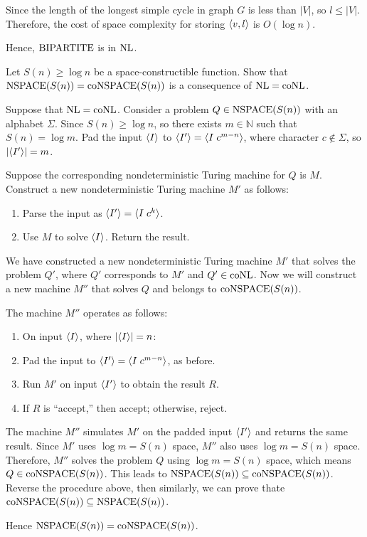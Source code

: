 \documentclass{homework}
\begin{document}
\begin{solution}
  Since the length of the longest simple cycle in graph $G$ is less than $|V|$,
  so $l \le |V|$.
  Therefore, the cost of space complexity for storing $\langle v, l\rangle$ is $O(\log n)$.

  Hence, $\mathrm{BIPARTITE}$ is in $\textup{NL}$.

\end{solution}

\begin{problem}
  Let $S(n) \ge \log n$ be a space-constructible function.
  Show that $\textup{NSPACE}(S(n)) = \textup{coNSPACE}(S(n))$ is a consequence of
  $\textup{NL} = \textup{coNL}$.
\end{problem}

\begin{solution}

  Suppose that $\textup{NL} = \textup{coNL}$. Consider a problem $Q \in \textup{NSPACE}(S(n))$
  with an alphabet $\Sigma$.
  Since $S(n) \ge \log n$, so there exists $m \in \mathbb{N}$
  such that $S(n) = \log m$.
  Pad the input $\langle I\rangle$ to $\langle I'\rangle = \langle I\;c^{m - n}\rangle$,
  where character $c \notin \Sigma$, so $|\langle I'\rangle| = m$.

  Suppose the corresponding nondeterministic Turing machine for $Q$ is $M$.
  Construct a new nondeterministic Turing machine $M'$ as follows:

  \begin{enumerate}
    \item Parse the input as $\langle I'\rangle = \langle I\;c^k\rangle$.
    \item Use $M$ to solve $\langle I\rangle$. Return the result.
  \end{enumerate}

  We have constructed a new nondeterministic Turing machine $M'$ that
  solves the problem $Q'$, where $Q'$ corresponds to $M'$ and $Q' \in \textup{coNL}$.
  Now we will construct a new machine $M''$ that
  solves $Q$ and belongs to $\textup{coNSPACE}(S(n))$.

  The machine $M''$ operates as follows:

  \begin{enumerate}
    \item On input $\langle I\rangle$, where $|\langle I\rangle| = n$:
    \item Pad the input to $\langle I'\rangle = \langle I\;c^{m-n}\rangle$, as before.
    \item Run $M'$ on input $\langle I'\rangle$ to obtain the result $R$.
    \item If $R$ is ``accept,'' then accept; otherwise, reject.
  \end{enumerate}

  The machine $M''$ simulates $M'$ on the padded input $\langle I'\rangle$
  and returns the same result. Since $M'$ uses $\log m = S(n)$ space,
  $M''$ also uses $\log m = S(n)$ space.
  Therefore, $M''$ solves the problem $Q$ using $\log m = S(n)$ space,
  which means $Q \in \textup{coNSPACE}(S(n))$. This leads to
  $\textup{NSPACE}(S(n)) \subseteq \textup{coNSPACE}(S(n))$. Reverse the
  procedure above, then similarly, we can prove thate
  $\textup{coNSPACE}(S(n)) \subseteq \textup{NSPACE}(S(n))$.

  Hence $\textup{NSPACE}(S(n)) = \textup{coNSPACE}(S(n))$.

\end{solution}
\end{document}
